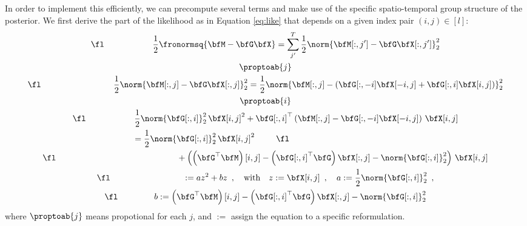 In order to implement this efficiently, we can precompute several terms and make use of the specific spatio-temporal group structure of the posterior. We first derive the part of the likelihood as in Equation \eqref{eq:like} that depends on a given index pair $(i,j) \in [l]$:
\begin{gather*}
\fl \hspace{2cm} \frac{1}{2} \fronormsq{\bfM - \bfG \bfX} = \sum_{j'}^{T} \frac{1}{2} \norm{\bfM[:,j'] - \bfG \bfX[:,j']}_2^2 \\
\proptoab{j} \\
\fl \hspace{3cm} \frac{1}{2} \norm{\bfM[:,j] - \bfG \bfX[:,j]}_2^2 = \frac{1}{2} \norm{\bfM[:,j] - \left( \bfG[:, -i] \bfX[-i,j] + \bfG[:, i] \bfX[i,j] \right)}_2^2 \\
\proptoab{i} \\
\fl \hspace{2cm} \frac{1}{2} \norm{\bfG[:,i]}_2^2 \, \bfX[i,j]^2 + \bfG[:,i]^\top \left(\bfM[:,j] - \bfG[:,-i] \bfX[-i,j] \right) \, \bfX[i,j] \\
\fl \hspace{-6.5cm} = \frac{1}{2} \norm{\bfG[:,i]}_2^2 \, \bfX[i,j]^2 \\
\fl \hspace{5cm} + \left( \left( \bfG^\top \bfM\right)[i,j] - \left({\bfG[:,i]}^\top \bfG\right) \bfX[:,j] - \norm{\bfG[:,i]}_2^2 \right) \, \bfX[i,j]\\
\fl\hspace{3cm} := a z^2 + b z \enspace , \quad \text{with} \quad z := \bfX[i,j] \enspace , \quad a := \frac{1}{2} \norm{\bfG[:,i]}_2^2 \enspace , \\
\fl \hspace{1.5cm} b :=  \left( \bfG^\top \bfM\right)[i,j] - \left({\bfG[:,i]}^\top \bfG\right) \bfX[:,j] - \norm{\bfG[:,i]}_2^2
\end{gather*}
where $\proptoab{j}$ means propotional for each $j$, and $:=$ assign the equation to a specific reformulation.

